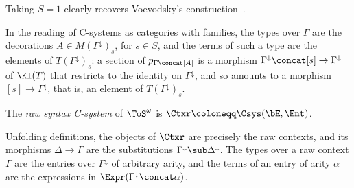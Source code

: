 \begin{remark}
    Taking $S = 1$ clearly recovers Voevodsky's construction~\cite[S6]{Voevodsky2016Relative}.
\end{remark}

\begin{remark}\label{rem:sorted-c-system-cwf}
    In the reading of C-systems as categories with families, the types over $\Gamma$ are the decorations $A \in M(\Gamma^{\downarrow})_s$, for $s \in S$, and the terms of such a type are the elements of $T(\Gamma^{\downarrow})_s$: a section of $p_{\Gamma \concat [A]}$ is a morphism $\Gamma^{\downarrow} \concat [s] \to \Gamma^{\downarrow}$ of $\Kl(T)$ that restricts to the identity on $\Gamma^{\downarrow}$, and so amounts to a morphism $[s] \to \Gamma^{\downarrow}$, that is, an element of $T(\Gamma^{\downarrow})_s$.
\end{remark}
    
\begin{definition}\label{def:raw-syntax-c-system}
    The \emph{raw syntax C-system} of $\ToS^\omega$ is $\Ctxr \coloneqq \Csys(\bE, \Ent)$.
\end{definition}

Unfolding definitions, the objects of $\Ctxr$ are precisely the raw contexts, and its morphisms $\Delta \to \Gamma$ are the substitutions $\Gamma^{\downarrow} \sub \Delta^{\downarrow}$. The types over a raw context $\Gamma$ are the entries over $\Gamma^{\downarrow}$ of arbitrary arity, and the terms of an entry of arity $\alpha$ are the expressions in $\Expr(\Gamma^{\downarrow} \concat \alpha)$.





